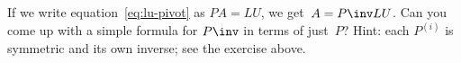   If we write equation~\eqref{eq:lu-pivot} as $PA=LU$, we get~$A=P\inv
  LU$. Can you come up with a simple formula for $P\inv$ in terms of
  just~$P$? Hint: each $P^{(i)}$ is symmetric and its own inverse; see
  the exercise above.
